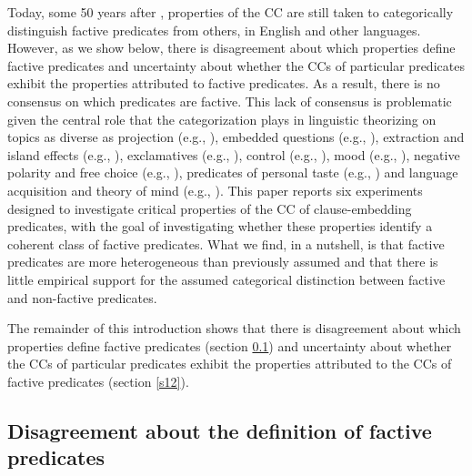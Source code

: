\documentclass[11pt,fleqn]{article}
\newcommand{\6}{\mbox{$[\hspace*{-.6mm}[$}}
\newcommand{\9}{\mbox{$]\hspace*{-.6mm}]$}}
\begin{document}
Today, some 50 years after \citealt{kiparsky-kiparsky70}, properties of the CC are still taken to categorically distinguish factive predicates from others, in English and other languages. However, as we show below, there is disagreement about which properties define factive predicates and uncertainty about whether the CCs of particular predicates exhibit the properties attributed to factive predicates. As a result, there is no consensus on which predicates are factive. This lack of consensus is problematic given the central role that the categorization plays in linguistic theorizing on topics as diverse as projection (e.g., \citealt{karttunen-peters79,vds92}), embedded questions (e.g., \citealt{hintikka1975,guerzoni-sharvit2007,spector-egre2015}), extraction and island effects (e.g., \citealt{hukari-levine1995,rooryck2000,abrusan2014}), exclamatives (e.g., \citealt{zanuttini-portner2003}), control (e.g., \citealt{landau2001}), mood (e.g., \citealt{van-gelderen2004,givon95,heycock2006,giannakidou-mari2015}), negative polarity and free choice (e.g., \citealt{giannakidou1998,giannakidou2001}), predicates of personal taste (e.g., \citealt{lasersohn2009}) and language acquisition and theory of mind (e.g., \citealt{devillers2005}). This paper reports six experiments designed to investigate critical properties of the CC of clause-embedding predicates, with the goal of investigating whether these properties identify a coherent class of factive predicates. What we find, in a nutshell, is that factive predicates are more heterogeneous than previously assumed and that there is little empirical support for the assumed categorical distinction between factive and non-factive predicates. 

The remainder of this introduction shows that there is disagreement about which properties define factive predicates (section \ref{s11}) and uncertainty about whether the CCs of particular predicates exhibit the properties attributed to the CCs of factive predicates (section \ref{s12}).




	
\subsection{Disagreement about the definition of factive predicates}\label{s11}

\end{document}
